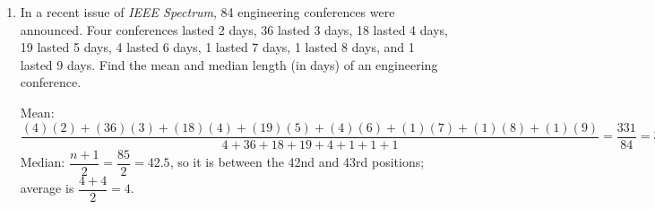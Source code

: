 \begin{enumerate}
\item In a recent issue of \textit{IEEE Spectrum}, 84 engineering conferences were announced. Four conferences lasted 2 days, 36 lasted 3 days, 18 lasted 4 days, 19 lasted 5 days, 4 lasted 6 days, 1 lasted 7 days, 1 lasted 8 days, and 1 lasted 9 days. Find the mean and median length (in days) of an engineering conference. 
\begin{center}
Mean: $\dfrac{(4)(2) + (36)(3) + (18)(4) + (19)(5) + (4)(6) + (1)(7) + (1)(8) + (1)(9)}{4 + 36 + 18 + 19 + 4 + 1 + 1 + 1} = \dfrac{331}{84} = 3.94$\\
Median: $\dfrac{n+1}{2} = \dfrac{85}{2} = 42.5$, so it is between the 42nd and 43rd positions; average is $\dfrac{4 + 4}{2} = 4$.
\end{center}
\end{enumerate}
